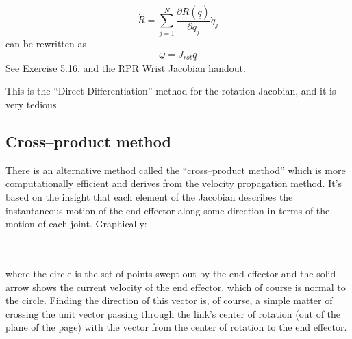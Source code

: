\documentclass[]{article}
\begin{document}
\begin{displaymath}
\dot{R} = \sum_{j=1}^{N} \frac{\partial R(\underline{q})}{\partial q_{j}}\dot{q}_{j}
\end{displaymath}
can be rewritten as
\begin{displaymath}
	\underline{\omega}=J_{rot}\dot{\underline{q}}
\end{displaymath}
See Exercise 5.16. and the RPR Wrist Jacobian handout.

This is the ``Direct Differentiation'' method for the rotation Jacobian, and it is very tedious.

\subsection{Cross--product method}
There is an alternative method called the ``cross--product method'' which is more computationally efficient and derives from the velocity propagation method. It's based on the insight that each element of the Jacobian describes the instantaneous motion of the end effector along some direction in terms of the motion of each joint. Graphically:

\\
\\

where the circle is the set of points swept out by the end effector and the solid arrow shows the current velocity of the end effector, which of course is normal to the circle. Finding the direction of this vector is, of course, a simple matter of crossing the unit vector passing through the link's center of rotation (out of the plane of the page) with the vector from the center of rotation to the end effector.
\end{document}
